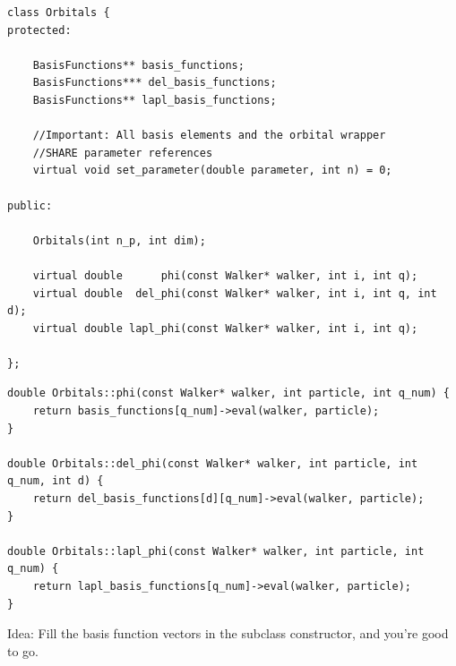 \documentclass{beamer}
\begin{document}
\begin{frame}[containsverbatim]
\scriptsize
 \begin{verbatim}
class Orbitals {
protected:

    BasisFunctions** basis_functions; 
    BasisFunctions*** del_basis_functions;
    BasisFunctions** lapl_basis_functions; 

    //Important: All basis elements and the orbital wrapper 
    //SHARE parameter references
    virtual void set_parameter(double parameter, int n) = 0;

public:

    Orbitals(int n_p, int dim);

    virtual double      phi(const Walker* walker, int i, int q);
    virtual double  del_phi(const Walker* walker, int i, int q, int d);
    virtual double lapl_phi(const Walker* walker, int i, int q);

};
 \end{verbatim}
\normalsize
\end{frame}


\begin{frame}[containsverbatim]
\scriptsize
 \begin{verbatim}
double Orbitals::phi(const Walker* walker, int particle, int q_num) {
    return basis_functions[q_num]->eval(walker, particle);
}

double Orbitals::del_phi(const Walker* walker, int particle, int q_num, int d) {
    return del_basis_functions[d][q_num]->eval(walker, particle);
}

double Orbitals::lapl_phi(const Walker* walker, int particle, int q_num) {
    return lapl_basis_functions[q_num]->eval(walker, particle);
}
 \end{verbatim}
\normalsize

Idea: Fill the basis function vectors in the subclass constructor, and you're good to go.

\end{frame}
\end{document}
